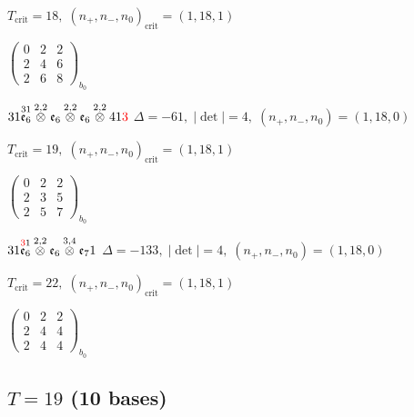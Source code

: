 \documentclass[10pt]{article}
\begin{document}
\hspace{1em}$T_{\text{crit}}=18,\; (n_+,n_-,n_0)_{\text{crit}}=(1,18,1)$

\hspace{2em}$\left(\begin{smallmatrix}0 & 2 & 2 \\ 2 & 4 & 6 \\ 2 & 6 & 8\end{smallmatrix}\right)_{\!b_0}$

\smallskip

$31\overset{31}{\mathfrak{e}_6}\overset{2,2}{\otimes}\mathfrak{e}_6\overset{2,2}{\otimes}\mathfrak{e}_6\overset{2,2}{\otimes}41\textcolor{red}{3}$ \quad $\Delta=-61,\; |\det|=4,\; (n_+,n_-,n_0)=(1,18,0)$

\hspace{1em}$T_{\text{crit}}=19,\; (n_+,n_-,n_0)_{\text{crit}}=(1,18,1)$

\hspace{2em}$\left(\begin{smallmatrix}0 & 2 & 2 \\ 2 & 3 & 5 \\ 2 & 5 & 7\end{smallmatrix}\right)_{\!b_0}$

\smallskip

$31\overset{\textcolor{red}{3}1}{\mathfrak{e}_6}\overset{2,2}{\otimes}\mathfrak{e}_6\overset{3,4}{\otimes}\mathfrak{e}_71$ \quad $\Delta=-133,\; |\det|=4,\; (n_+,n_-,n_0)=(1,18,0)$

\hspace{1em}$T_{\text{crit}}=22,\; (n_+,n_-,n_0)_{\text{crit}}=(1,18,1)$

\hspace{2em}$\left(\begin{smallmatrix}0 & 2 & 2 \\ 2 & 4 & 4 \\ 2 & 4 & 4\end{smallmatrix}\right)_{\!b_0}$


\subsection*{$T = 19$ \quad (10 bases)}
\smallskip
\end{document}

